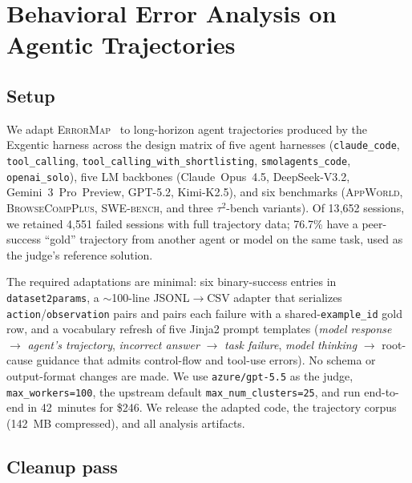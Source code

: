 
\section{Behavioral Error Analysis on Agentic Trajectories}
\label{sec:agentic-errormap}

\subsection{Setup}

We adapt \textsc{ErrorMap}~\cite{ashury2026errormap} to long-horizon
agent trajectories produced by the Exgentic harness across the
design matrix of five agent harnesses (\texttt{claude\_code},
\texttt{tool\_calling}, \texttt{tool\_calling\_with\_shortlisting},
\texttt{smolagents\_code}, \texttt{openai\_solo}), five LM backbones
(Claude~Opus~4.5, DeepSeek-V3.2, Gemini~3~Pro~Preview, GPT-5.2,
Kimi-K2.5), and six benchmarks (\textsc{AppWorld},
\textsc{BrowseCompPlus}, \textsc{SWE-bench}, and three
$\tau^2$-bench variants). Of 13{,}652 sessions, we retained
4{,}551 failed sessions with full trajectory data; 76.7\% have a
peer-success ``gold'' trajectory from another agent or model on the
same task, used as the judge's reference solution.

The required adaptations are minimal: six binary-success entries
in \texttt{dataset2params}, a \mbox{$\sim$100-line} JSONL$\rightarrow$CSV
adapter that serializes \texttt{action}/\texttt{observation} pairs
and pairs each failure with a shared-\texttt{example\_id} gold row,
and a vocabulary refresh of five Jinja2 prompt templates
(\emph{model response} $\rightarrow$ \emph{agent's trajectory},
\emph{incorrect answer} $\rightarrow$ \emph{task failure},
\emph{model thinking} $\rightarrow$ root-cause guidance that admits
control-flow and tool-use errors). No schema or output-format
changes are made. We use \texttt{azure/gpt-5.5} as the judge,
\texttt{max\_workers=100}, the upstream default
\texttt{max\_num\_clusters=25}, and run end-to-end in 42~minutes for
\$246. We release the adapted code, the trajectory corpus
(142~MB compressed), and all analysis artifacts.

\subsection{Cleanup pass}

